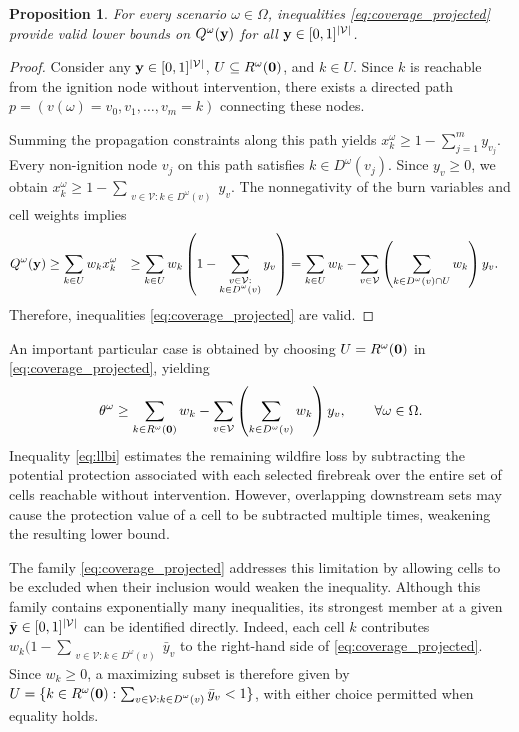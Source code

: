 \documentclass{itor}
\newtheorem{proposition}{Proposition}
\begin{document}
\begin{proposition}
\label{prop:coverage_validity}
For every scenario $\omega \in \Omega$, inequalities
\eqref{eq:coverage_projected} provide valid lower bounds
on $Q^\omega(\vb{y})$ for all
$\vb{y} \in [0,1]^{|\mathcal{V}|}$.
\end{proposition}

\begin{proof}
Consider any $\vb{y} \in [0,1]^{|\mathcal{V}|}$,
$U \subseteq R^\omega(\vb{0})$, and $k \in U$.
Since $k$ is reachable from the ignition node without
intervention, there exists a directed path
$p=(v(\omega)=v_0,v_1,\ldots,v_m=k)$ connecting these
nodes.

Summing the propagation constraints along this path yields  $x_k^\omega \geq
1-\sum_{j=1}^{m}y_{v_j}$. Every non-ignition node $v_j$ on this path satisfies
$k \in D^\omega(v_j)$. Since $y_v \geq 0$, we obtain $x_k^\omega \geq
1-\sum_{\substack{v \in \mathcal{V}: k \in D^\omega(v)}}y_v$. The nonnegativity of the burn variables and cell weights implies
%
\begin{align*}
Q^\omega(\vb{y})
&\geq
\sum_{k \in U}w_k x_k^\omega
\nonumber
&\geq
\sum_{k \in U}w_k
\left(
1-
\sum_{\substack{v \in \mathcal{V}:\\
k \in D^\omega(v)}}y_v
\right)
\nonumber
&=
\sum_{k \in U}w_k
-
\sum_{v \in \mathcal{V}}
\left(
\sum_{k \in D^\omega(v)\cap U}w_k
\right)y_v.
\end{align*}
%
Therefore, inequalities \eqref{eq:coverage_projected}
are valid.
\end{proof}

An important particular case is obtained by choosing $U=R^\omega(\vb{0})$ in \eqref{eq:coverage_projected}, yielding
%
\begin{equation}
\label{eq:llbi}
\theta^\omega \geq
\sum_{k \in R^\omega(\vb{0})} w_k
-
\sum_{v \in \mathcal{V}}
\left(
\sum_{k \in D^\omega(v)} w_k
\right)y_v,
\qquad \forall \omega \in \Omega.
\end{equation}
%
Inequality \eqref{eq:llbi} estimates the remaining wildfire loss by subtracting the potential protection associated with each selected firebreak over the entire set of cells reachable without intervention. However, overlapping downstream sets may cause the protection value of a cell to be subtracted multiple times, weakening the resulting lower bound.

The family \eqref{eq:coverage_projected} addresses this limitation by allowing cells to be excluded when their inclusion would weaken the inequality. Although this family contains exponentially many inequalities, its strongest member at a given $\bar{\vb{y}} \in [0,1]^{|\mathcal{V}|}$ can be identified directly. Indeed, each cell $k$ contributes $w_k(1- \sum_{\substack{v \in \mathcal{V}: k \in D^\omega(v)}}\bar{y}_v$ to the right-hand side of \eqref{eq:coverage_projected}. Since $w_k \geq 0$, a maximizing subset is therefore given by  $U = \{
k \in R^\omega(\vb{0}) :
\sum_{\substack{v \in \mathcal{V}: k \in D^\omega(v)}}\bar{y}_v < 1
\}$, with either choice permitted when equality holds.
\end{document}
